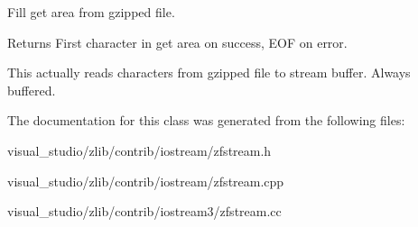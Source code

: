 Fill get area from gzipped file. 

\begin{DoxyReturn}{Returns}
First character in get area on success, E\+OF on error.
\end{DoxyReturn}
This actually reads characters from gzipped file to stream buffer. Always buffered. 

The documentation for this class was generated from the following files\+:\begin{DoxyCompactItemize}
\item 
visual\+\_\+studio/zlib/contrib/iostream/zfstream.\+h\item 
visual\+\_\+studio/zlib/contrib/iostream/zfstream.\+cpp\item 
visual\+\_\+studio/zlib/contrib/iostream3/zfstream.\+cc\end{DoxyCompactItemize}
